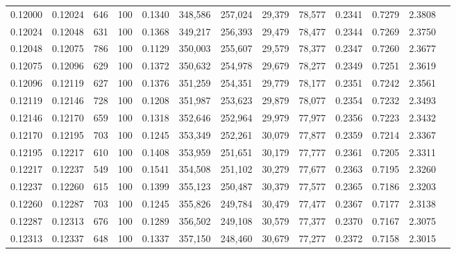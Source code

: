 \begin{tabular}{rrrrrrrrrrrrr}
0.12000 & 0.12024 &   646 & 100 &                                     0.1340 & 348,586 & 257,024 &  29,379 &  78,577 & 0.2341 & 0.7279 & 2.3808 \\
0.12024 & 0.12048 &   631 & 100 &                                     0.1368 & 349,217 & 256,393 &  29,479 &  78,477 & 0.2344 & 0.7269 & 2.3750 \\
0.12048 & 0.12075 &   786 & 100 &                                     0.1129 & 350,003 & 255,607 &  29,579 &  78,377 & 0.2347 & 0.7260 & 2.3677 \\
0.12075 & 0.12096 &   629 & 100 &                                     0.1372 & 350,632 & 254,978 &  29,679 &  78,277 & 0.2349 & 0.7251 & 2.3619 \\
0.12096 & 0.12119 &   627 & 100 &                                     0.1376 & 351,259 & 254,351 &  29,779 &  78,177 & 0.2351 & 0.7242 & 2.3561 \\
0.12119 & 0.12146 &   728 & 100 &                                     0.1208 & 351,987 & 253,623 &  29,879 &  78,077 & 0.2354 & 0.7232 & 2.3493 \\
0.12146 & 0.12170 &   659 & 100 &                                     0.1318 & 352,646 & 252,964 &  29,979 &  77,977 & 0.2356 & 0.7223 & 2.3432 \\
0.12170 & 0.12195 &   703 & 100 &                                     0.1245 & 353,349 & 252,261 &  30,079 &  77,877 & 0.2359 & 0.7214 & 2.3367 \\
0.12195 & 0.12217 &   610 & 100 &                                     0.1408 & 353,959 & 251,651 &  30,179 &  77,777 & 0.2361 & 0.7205 & 2.3311 \\
0.12217 & 0.12237 &   549 & 100 &                                     0.1541 & 354,508 & 251,102 &  30,279 &  77,677 & 0.2363 & 0.7195 & 2.3260 \\
0.12237 & 0.12260 &   615 & 100 &                                     0.1399 & 355,123 & 250,487 &  30,379 &  77,577 & 0.2365 & 0.7186 & 2.3203 \\
0.12260 & 0.12287 &   703 & 100 &                                     0.1245 & 355,826 & 249,784 &  30,479 &  77,477 & 0.2367 & 0.7177 & 2.3138 \\
0.12287 & 0.12313 &   676 & 100 &                                     0.1289 & 356,502 & 249,108 &  30,579 &  77,377 & 0.2370 & 0.7167 & 2.3075 \\
0.12313 & 0.12337 &   648 & 100 &                                     0.1337 & 357,150 & 248,460 &  30,679 &  77,277 & 0.2372 & 0.7158 & 2.3015 \\

\end{tabular}
